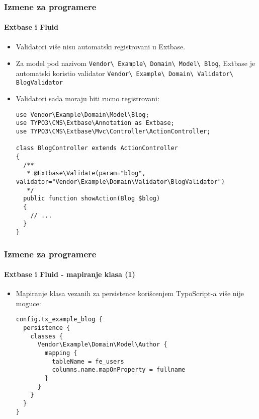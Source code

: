 \begin{frame}[fragile]
	\frametitle{Izmene za programere}
	\framesubtitle{Extbase i Fluid}

	\lstset{basicstyle=\tiny\ttfamily}

	\begin{itemize}
		\item Validatori više nisu automatski registrovani u Extbase.
		\item Za model pod nazivom
			\small\texttt{Vendor\textbackslash
				Example\textbackslash
				Domain\textbackslash
				Model\textbackslash
				Blog}\normalsize,\newline
			Extbase je automatski koristio validator
			\small\texttt{Vendor\textbackslash
				Example\textbackslash
				Domain\textbackslash
				Validator\textbackslash
				BlogValidator}\normalsize

		\item Validatori sada moraju biti rucno registrovani:

\begin{lstlisting}
use Vendor\Example\Domain\Model\Blog;
use TYPO3\CMS\Extbase\Annotation as Extbase;
use TYPO3\CMS\Extbase\Mvc\Controller\ActionController;

class BlogController extends ActionController
{
  /**
   * @Extbase\Validate(param="blog", validator="Vendor\Example\Domain\Validator\BlogValidator")
   */
  public function showAction(Blog $blog)
  {
    // ...
  }
}
\end{lstlisting}

	\end{itemize}

\end{frame}


\begin{frame}[fragile]
	\frametitle{Izmene za programere}
	\framesubtitle{Extbase i Fluid - mapiranje klasa (1)}

	\lstset{basicstyle=\tiny\ttfamily}

	\begin{itemize}
		\item Mapiranje klasa vezanih za persistence korišcenjem TypoScript-a više nije moguce:

\begin{lstlisting}
config.tx_example_blog {
  persistence {
    classes {
      Vendor\Example\Domain\Model\Author {
        mapping {
          tableName = fe_users
          columns.name.mapOnProperty = fullname
        }
      }
    }
  }
}
\end{lstlisting}

	\end{itemize}

\end{frame}

